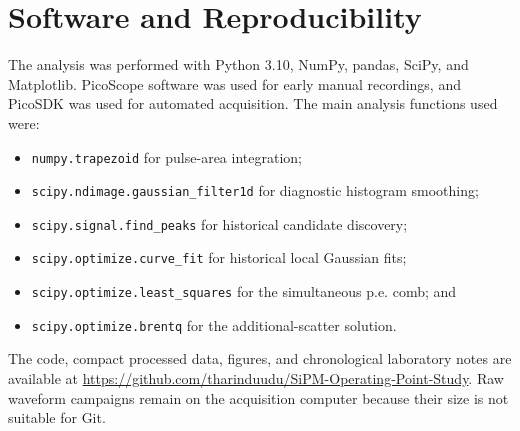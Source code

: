 \section{Software and Reproducibility}

The analysis was performed with Python 3.10, NumPy, pandas, SciPy, and Matplotlib. PicoScope software was used for early manual recordings, and PicoSDK was used for automated acquisition. The main analysis functions used were:

\begin{itemize}[leftmargin=*]
  \item \texttt{numpy.trapezoid} for pulse-area integration;
  \item \texttt{scipy.ndimage.gaussian\_filter1d} for diagnostic histogram smoothing;
  \item \texttt{scipy.signal.find\_peaks} for historical candidate discovery;
  \item \texttt{scipy.optimize.curve\_fit} for historical local Gaussian fits;
  \item \texttt{scipy.optimize.least\_squares} for the simultaneous p.e. comb; and
  \item \texttt{scipy.optimize.brentq} for the additional-scatter solution.
\end{itemize}

The code, compact processed data, figures, and chronological laboratory notes are available at
\url{https://github.com/tharinduudu/SiPM-Operating-Point-Study}. Raw waveform campaigns remain on the acquisition computer because their size is not suitable for Git.

